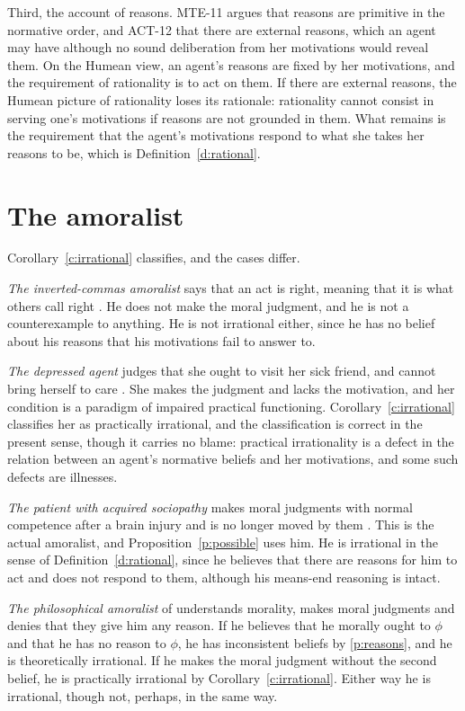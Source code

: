 \documentclass{situationist-preprint}
\begin{document}
Third, the account of reasons. MTE-11 argues that reasons are primitive in the normative order, and ACT-12 that there are external reasons, which an agent may have although no sound deliberation from her motivations would reveal them. On the Humean view, an agent's reasons are fixed by her motivations, and the requirement of rationality is to act on them. If there are external reasons, the Humean picture of rationality loses its rationale: rationality cannot consist in serving one's motivations if reasons are not grounded in them. What remains is the requirement that the agent's motivations respond to what she takes her reasons to be, which is Definition~\ref{d:rational}.

\section{The amoralist}\label{s:amoralist}

Corollary~\ref{c:irrational} classifies, and the cases differ.

\emph{The inverted-commas amoralist} says that an act is right, meaning that it is what others call right \citep{Hare1952}. He does not make the moral judgment, and he is not a counterexample to anything. He is not irrational either, since he has no belief about his reasons that his motivations fail to answer to.

\emph{The depressed agent} judges that she ought to visit her sick friend, and cannot bring herself to care \citep{Stocker1979}. She makes the judgment and lacks the motivation, and her condition is a paradigm of impaired practical functioning. Corollary~\ref{c:irrational} classifies her as practically irrational, and the classification is correct in the present sense, though it carries no blame: practical irrationality is a defect in the relation between an agent's normative beliefs and her motivations, and some such defects are illnesses.

\emph{The patient with acquired sociopathy} makes moral judgments with normal competence after a brain injury and is no longer moved by them \citep{Roskies2003}. This is the actual amoralist, and Proposition~\ref{p:possible} uses him. He is irrational in the sense of Definition~\ref{d:rational}, since he believes that there are reasons for him to act and does not respond to them, although his means-end reasoning is intact.

\emph{The philosophical amoralist} of \citet{Brink1989} understands morality, makes moral judgments and denies that they give him any reason. If he believes that he morally ought to $\phi$ and that he has no reason to $\phi$, he has inconsistent beliefs by \ref{p:reasons}, and he is theoretically irrational. If he makes the moral judgment without the second belief, he is practically irrational by Corollary~\ref{c:irrational}. Either way he is irrational, though not, perhaps, in the same way.
\end{document}
